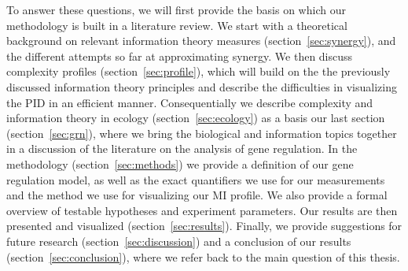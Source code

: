 \documentclass[../main.tex]{subfiles}
\begin{document}
To answer these questions, we will first provide the basis on which our methodology is built in a literature review.
We start with a theoretical background on relevant information theory measures (section~\ref{sec:synergy}), and the different attempts so far at approximating synergy.
We then discuss complexity profiles (section~\ref{sec:profile}), which will build on the the previously discussed information theory principles and describe the difficulties in visualizing the PID in an efficient manner.
Consequentially we describe complexity and information theory in ecology (section~\ref{sec:ecology}) as a basis our last section (section~\ref{sec:grn}), where we bring the biological and information topics together in a discussion of the literature on the analysis of gene regulation.
In the methodology (section~\ref{sec:methods}) we provide a definition of our gene regulation model, as well as the exact quantifiers we use for our measurements and the method we use for visualizing our MI profile.
We also provide a formal overview of testable hypotheses and experiment parameters.
Our results are then presented and visualized (section~\ref{sec:results}).
Finally, we provide suggestions for future research (section~\ref{sec:discussion}) and a conclusion of our results (section~\ref{sec:conclusion}), where we refer back to the main question of this thesis.
\end{document}
